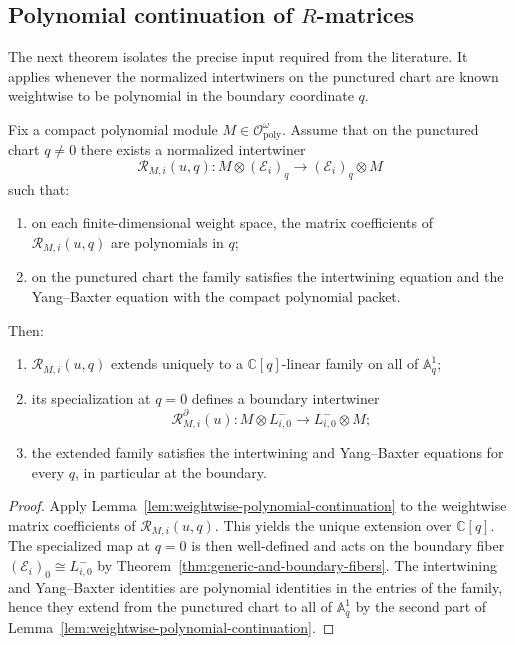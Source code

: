 \subsection{Polynomial continuation of $R$-matrices}

The next theorem isolates the precise input required from the literature.
It applies whenever the normalized intertwiners on the punctured chart are
known weightwise to be polynomial in the boundary coordinate $q$.

\begin{theorem}
\ClaimStatusProvedHere
\label{thm:continuation-of-polynomial-R-matrices}
Fix a compact polynomial module $M\in \mathcal O^{\omega}_{\mathrm{poly}}$.
Assume that on the punctured chart $q\neq 0$ there exists a normalized
intertwiner
\begin{equation}
\mathscr R_{M,i}(u,q):
M\otimes (\mathcal E_i)_q
\longrightarrow
(\mathcal E_i)_q\otimes M
\end{equation}
such that:
\begin{enumerate}
    \item on each finite-dimensional weight space, the matrix
    coefficients of $\mathscr R_{M,i}(u,q)$ are polynomials in $q$;
    \item on the punctured chart the family satisfies the intertwining
    equation and the Yang--Baxter equation with the compact polynomial
    packet.
\end{enumerate}
Then:
\begin{enumerate}
    \item $\mathscr R_{M,i}(u,q)$ extends uniquely to a
    $\mathbb C[q]$-linear family on all of $\mathbb A^1_q$;
    \item its specialization at $q=0$ defines a boundary intertwiner
    \begin{equation}
    \mathscr R_{M,i}^{\partial}(u):
    M\otimes L^-_{i,0}
    \longrightarrow
    L^-_{i,0}\otimes M;
    \end{equation}
    \item the extended family satisfies the intertwining and
    Yang--Baxter equations for every $q$, in particular at the boundary.
\end{enumerate}
\end{theorem}

\begin{proof}
Apply Lemma~\ref{lem:weightwise-polynomial-continuation} to the weightwise
matrix coefficients of $\mathscr R_{M,i}(u,q)$.  This yields the unique
extension over $\mathbb C[q]$.  The specialized map at $q=0$ is then
well-defined and acts on the boundary fiber
$(\mathcal E_i)_0\cong L^-_{i,0}$ by
Theorem~\ref{thm:generic-and-boundary-fibers}.  The intertwining and
Yang--Baxter identities are polynomial identities in the entries of the
family, hence they extend from the punctured chart to all of
$\mathbb A^1_q$ by the second part of
Lemma~\ref{lem:weightwise-polynomial-continuation}.
\end{proof}

